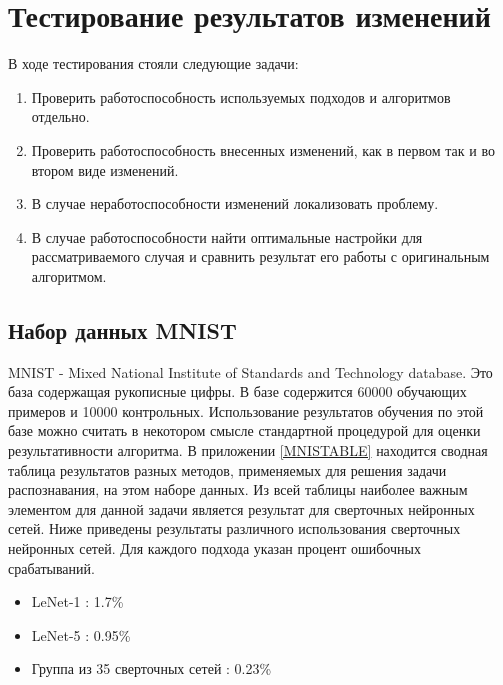\documentclass[utf8,usehyperref,14pt]{G7-32}
\begin{document}
\chapter{Тестирование результатов изменений}
В ходе тестирования стояли следующие задачи:
\begin{enumerate}
\item Проверить работоспособность используемых подходов и алгоритмов отдельно.
\item Проверить работоспособность внесенных изменений, как в первом так и во втором виде изменений.
\item В случае неработоспособности изменений локализовать проблему.
\item В случае работоспособности найти оптимальные настройки для рассматриваемого случая и сравнить результат его работы с оригинальным алгоритмом.
\end{enumerate}
\section{Набор данных MNIST}
MNIST - Mixed National Institute of Standards and Technology database. Это база содержащая рукописные цифры. В базе содержится 60000 обучающих примеров и 10000 контрольных. Использование результатов обучения по этой базе можно считать в некотором смысле стандартной процедурой для оценки результативности алгоритма. В приложении \ref{MNISTABLE} находится сводная таблица результатов разных методов, применяемых для решения задачи распознавания, на этом наборе данных. Из всей таблицы наиболее важным элементом для данной задачи является результат для сверточных нейронных сетей. Ниже приведены результаты различного использования сверточных нейронных сетей. Для каждого подхода указан процент ошибочных срабатываний.
\begin{itemize}
\item LeNet-1 : 1.7\%
\item LeNet-5 : 0.95\%
\item Группа из 35 сверточных сетей : 0.23\%
\end{itemize}
\end{document}
